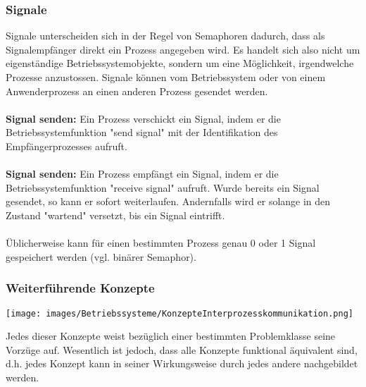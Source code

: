 \clearpage

\subsubsection{Signale}
Signale unterscheiden sich in der Regel von Semaphoren dadurch, dass als
Signalempfänger direkt ein Prozess angegeben wird. Es handelt sich also nicht
um eigenständige Betriebssystemobjekte, sondern um eine Möglichkeit, irgendwelche
Prozesse anzustossen. Signale können vom Betriebssystem oder von einem Anwenderprozess an einen anderen Prozess gesendet werden.\\\\
\textbf{Signal senden:} Ein Prozess verschickt ein Signal, indem er die Betriebssystemfunktion
"send signal" mit der Identifikation des Empfängerprozesses aufruft.\\\\
\textbf{Signal senden:} Ein Prozess empfängt ein Signal, indem er die Betriebssystemfunktion "receive signal" aufruft. Wurde bereits ein Signal gesendet, so kann er sofort
weiterlaufen. Andernfalls wird er solange in den Zustand "wartend" versetzt, bis ein Signal eintrifft.\\\\
Üblicherweise kann für einen bestimmten Prozess genau 0 oder 1 Signal
gespeichert werden (vgl. binärer Semaphor).



\subsubsection{Weiterführende Konzepte}
\begin{minipage}{0.5\textwidth}
    \texttt{[image: images/Betriebssysteme/KonzepteInterprozesskommunikation.png]}
\end{minipage}
\hfill
\begin{minipage}{0.45\textwidth}
    Jedes dieser Konzepte weist bezüglich einer bestimmten Problemklasse seine Vorzüge auf. Wesentlich ist jedoch, dass alle Konzepte funktional äquivalent sind, d.h. jedes Konzept kann in seiner Wirkungsweise durch jedes andere nachgebildet werden.
\end{minipage}

